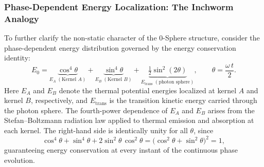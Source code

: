 \documentclass[12pt,letterpaper]{article}
\begin{document}
\subsubsection{Phase-Dependent Energy Localization: The Inchworm Analogy}
\label{subsubsec:inchworm}
To further clarify the non-static character of the 0-Sphere structure, consider the phase-dependent energy distribution governed by the energy conservation identity:
\begin{equation}
  E_0 = \underbrace{\cos^4\!\theta}_{E_A\;(\text{Kernel }A)} + \underbrace{\sin^4\!\theta}_{E_B\;(\text{Kernel }B)} + \underbrace{\tfrac{1}{2}\sin^2\!(2\theta)}_{E_{\mathrm{trans}}\;(\text{photon sphere})}, \qquad \theta = \frac{\omega\,t}{2}.
\end{equation}
Here $E_A$ and $E_B$ denote the thermal potential energies localized at kernel $A$ and kernel $B$, respectively, and $E_{\mathrm{trans}}$ is the transition kinetic energy carried through the photon sphere. The fourth-power dependence of $E_A$ and $E_B$ arises from the Stefan--Boltzmann radiation law applied to thermal emission and absorption at each kernel. The right-hand side is identically unity for all $\theta$, since
\[
  \cos^4\!\theta + \sin^4\!\theta + 2\sin^2\!\theta\,\cos^2\!\theta = \bigl(\cos^2\!\theta + \sin^2\!\theta\bigr)^2 = 1,
\]
guaranteeing energy conservation at every instant of the continuous phase evolution.
\end{document}
